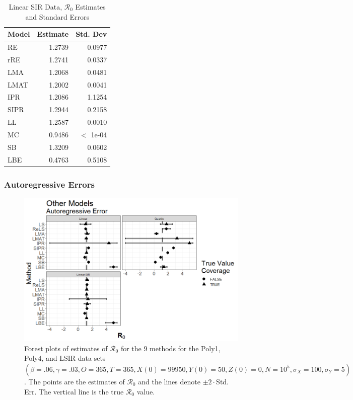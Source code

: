 \documentclass[12pt]{article}
\newcommand{\xxsir}{\ensuremath{9} } %
\newcommand{\rr}{\ensuremath{\mathcal{R}_0}}
\begin{document}
\begin{table}[H]
	
	\centering
	\begin{tabular}[t]{l|r|r}
		\hline
		Model & Estimate & Std. Dev\\
		\hline
		RE & 1.2739 & 0.0977\\
		\hline
		rRE & 1.2741 & 0.0337\\
		\hline
		LMA & 1.2068 & 0.0481\\
		\hline
		LMAT & 1.2002 & 0.0041\\
		\hline
		IPR & 1.2086 & 1.1254\\
		\hline
		SIPR & 1.2944 & 0.2158\\
		\hline
		LL & 1.2587 & 0.0010\\
		\hline
		MC & 0.9486 & $<$ 1e-04\\
		\hline
		SB & 1.3209 & 0.0602\\
		\hline
		LBE & 0.4763 & 0.5108\\
		\hline
	\end{tabular}
	\caption{Linear SIR Data, $\rr$ Estimates and Standard Errors}
\end{table}



\subsubsection{Autoregressive Errors}

\begin{figure}[H]
	\begin{center}
		\includegraphics[scale=0.5]{images/other_ar.tiff}
		\caption{Forest plots of estimates of $\rr$ for the \xxsir methods for the Poly1, Poly4, and LSIR data sets $(\beta=.06, \gamma=.03, O=365, T=365, X(0)=99950, Y(0)=50, Z(0)=0, N=10^5, \sigma_X=100, \sigma_Y=5)$.  The points are the estimates of $\rr$ and the lines denote $\pm 2\cdot $Std. Err.  The vertical line is the true $\rr$ value.}
	\end{center}
\end{figure}
\end{document}
